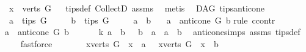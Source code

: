 \begin{isabellebody}
\ \ \ {\isachardoublequoteopen}x\ {\isasymin}\ verts\ G{\isachardoublequoteclose}%
\isadelimproof
\ %
\endisadelimproof
%
\isatagproof
{}\isamarkupfalse%
\ tips{\isacharunderscore}{\kern0pt}def\ CollectD\ assms{\isacharparenleft}{\kern0pt}{}{\isacharparenright}{\kern0pt}\ \isamarkupfalse%
\ metis%
\endisatagproof
{\isafoldproof}%
%
\isadelimproof
%
\endisadelimproof
%
\isadelimdocument
%
\endisadelimdocument
%
\isatagdocument
%
\isamarkuptrue%
%
\endisatagdocument
{\isafolddocument}%
%
\isadelimdocument
%
\endisadelimdocument
{}\isamarkupfalse%
\ {\isacharparenleft}{\kern0pt}\ DAG{\isacharparenright}{\kern0pt}\ tips{\isacharunderscore}{\kern0pt}anticone{\isacharcolon}{\kern0pt}\isanewline
\ \ \ {\isachardoublequoteopen}a\ {\isasymin}\ tips\ G{\isachardoublequoteclose}\isanewline
\ \ \ \ \ {\isachardoublequoteopen}b\ {\isasymin}\ tips\ G{\isachardoublequoteclose}\isanewline
\ \ \ \ \ {\isachardoublequoteopen}a\ {\isasymnoteq}\ b{\isachardoublequoteclose}\isanewline
\ \ \ {\isachardoublequoteopen}a\ {\isasymin}\ anticone\ G\ b{\isachardoublequoteclose}\isanewline
%
\isadelimproof
%
\endisadelimproof
%
\isatagproof
{}\isamarkupfalse%
{\isacharparenleft}{\kern0pt}rule\ ccontr{\isacharparenright}{\kern0pt}\isanewline
\ \ \isamarkupfalse%
\ {\isachardoublequoteopen}\ a\ {\isasymnotin}\ anticone\ G\ b{\isachardoublequoteclose}\ \isanewline
\ \ \isamarkupfalse%
\ \isamarkupfalse%
\ k{\isacharcolon}{\kern0pt}\ {\isachardoublequoteopen}{\isacharparenleft}{\kern0pt}a\ {\isasymrightarrow}\isactrlsup {\isacharplus}{\kern0pt}\ b\ {\isasymor}\ \ b\ {\isasymrightarrow}\isactrlsup {\isacharplus}{\kern0pt}\ a\ {\isasymor}\ a\ {\isacharequal}{\kern0pt}\ b{\isacharparenright}{\kern0pt}{\isachardoublequoteclose}\ \isamarkupfalse%
\ anticone{\isachardot}{\kern0pt}simps\ assms\ tips{\isacharunderscore}{\kern0pt}def\isanewline
\ \ \ \ \isamarkupfalse%
\ fastforce\ \isanewline
\ \ \isamarkupfalse%
\ \isamarkupfalse%
\ {\isachardoublequoteopen}{\isasymnot}\ {\isacharparenleft}{\kern0pt}{\isasymforall}x{\isasymin}verts\ G{\isachardot}{\kern0pt}\ \ x\ {\isasymrightarrow}\isactrlsup {\isacharplus}{\kern0pt}\ a{\isacharparenright}{\kern0pt}\ {\isasymor}\ {\isasymnot}\ {\isacharparenleft}{\kern0pt}{\isasymforall}x{\isasymin}verts\ G{\isachardot}{\kern0pt}\ \ x\ {\isasymrightarrow}\isactrlsup {\isacharplus}{\kern0pt}\ b{\isacharparenright}{\kern0pt}{\isachardoublequoteclose}\ \isamarkupfalse%

\end{isabellebody}
